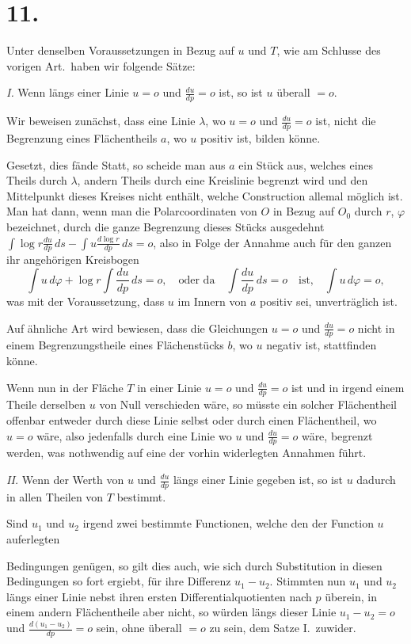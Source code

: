 \documentclass{article}
\begin{document}
\section*{11.}

Unter denselben Voraussetzungen in Bezug auf $u$ und $T$, wie am Schlusse des vorigen Art.\ haben wir folgende Sätze:

\emph{I.} Wenn längs einer Linie $u = o$ und $\frac{du}{dp} = o$ ist, so ist $u$ überall $= o$.

Wir beweisen zunächst, dass eine Linie $\lambda$, wo $u = o$ und $\frac{du}{dp} = o$ ist, nicht die Begrenzung eines Flächentheils $a$, wo $u$ positiv ist, bilden könne.

Gesetzt, dies fände Statt, so scheide man aus $a$ ein Stück aus, welches eines Theils durch $\lambda$, andern Theils durch eine Kreislinie begrenzt wird und den Mittelpunkt dieses Kreises nicht enthält, welche Construction allemal möglich ist. Man hat dann, wenn man die Polarcoordinaten von $O$ in Bezug auf $O_0$ durch $r$, $\varphi$ bezeichnet, durch die ganze Begrenzung dieses Stücks ausgedehnt $\displaystyle\int \log r\frac{du}{dp}\,ds - \displaystyle\int u\frac{d\log r}{dp}\,ds = o$, also in Folge der Annahme auch für den ganzen ihr angehörigen Kreisbogen
\[
\int u\,d\varphi + \log r \int \frac{du}{dp}\,ds = o, \quad \text{oder da} \quad \int \frac{du}{dp}\,ds = o \quad \text{ist,} \quad \int u\,d\varphi = o,
\]
was mit der Voraussetzung, dass $u$ im Innern von $a$ positiv sei, unverträglich ist.

Auf ähnliche Art wird bewiesen, dass die Gleichungen $u = o$ und $\frac{du}{dp} = o$ nicht in einem Begrenzungstheile eines Flächenstücks $b$, wo $u$ negativ ist, stattfinden könne.

Wenn nun in der Fläche $T$ in einer Linie $u = o$ und $\frac{du}{dp} = o$ ist und in irgend einem Theile derselben $u$ von Null verschieden wäre, so müsste ein solcher Flächentheil offenbar entweder durch diese Linie selbst oder durch einen Flächentheil, wo $u = o$ wäre, also jedenfalls durch eine Linie wo $u$ und $\frac{du}{dp} = o$ wäre, begrenzt werden, was nothwendig auf eine der vorhin widerlegten Annahmen führt.

\emph{II.} Wenn der Werth von $u$ und $\frac{du}{dp}$ längs einer Linie gegeben ist, so ist $u$ dadurch in allen Theilen von $T$ bestimmt.

Sind $u_1$ und $u_2$ irgend zwei bestimmte Functionen, welche den der Function $u$ auferlegten

Bedingungen genügen, so gilt dies auch, wie sich durch Substitution in diesen Bedingungen so fort ergiebt, für ihre Differenz $u_1 - u_2$. Stimmten nun $u_1$ und $u_2$ längs einer Linie nebst ihren ersten Differentialquotienten nach $p$ überein, in einem andern Flächentheile aber nicht, so würden längs dieser Linie $u_1 - u_2 = o$ und $\frac{d(u_1 - u_2)}{dp} = o$ sein, ohne überall $= o$ zu sein, dem Satze I.\ zuwider.
\end{document}
